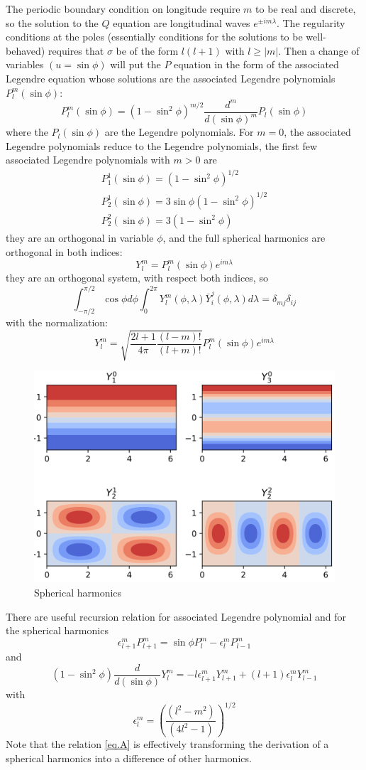 The periodic boundary condition on longitude require $m$ to be real and discrete, so the solution to the $Q$ equation are longitudinal waves $e^{\pm im\lambda}$. The regularity conditions at the poles (essentially conditions for the solutions to be well-behaved) requires that $\sigma$ be of the form $l(l+1)$ with $l\geq|m|$. Then a change of variables $(u=\sin\phi)$ will put the $P$ equation in the form of the associated Legendre equation whose solutions are the associated Legendre polynomials $P_l^m(\sin\phi)$:
\begin{equation}\label{eq.Legendre polyn}
	P_l^m(\sin\phi)=(1-\sin^2\phi)^{m/2}\frac{d^m}{d(\sin\phi)^m}P_l(\sin\phi)
\end{equation}
where the $P_l(\sin\phi)$ are the Legendre polynomials. For $m=0$, the associated Legendre polynomials reduce to the
Legendre polynomials, the first few associated Legendre
polynomials with $m>0$ are
\begin{align*}
	P_1^1(\sin\phi)=(1-\sin^2\phi)^{1/2}          \\
	P_2^1(\sin\phi)=3\sin\phi(1-\sin^2\phi)^{1/2} \\
	P_2^2(\sin\phi)=3(1-\sin^2\phi)
\end{align*}
they are an orthogonal in variable $\phi$, and the full spherical harmonics are orthogonal in both indices:
\begin{equation}
	Y_l^m=P_l^m(\sin\phi)e^{im\lambda}
\end{equation}
they are an orthogonal system, with respect both indices, so
\begin{equation}
	\int_{-\pi/2}^{\pi/2}\cos\phi d\phi\int_0^{2\pi}Y_l^m(\phi,\lambda)\bar{Y}_i^j(\phi,\lambda)d\lambda=\delta_{mj}\delta_{ij}
\end{equation}
with the normalization:
$$Y_l^m=\sqrt{\frac{2l+1}{4\pi}\frac{(l-m)!}{(l+m)!}}P_l^m(\sin\phi)e^{im\lambda}$$
\begin{figure}[h]
	\centering
	\includegraphics[width=0.5\linewidth]{uploads/Screenshot 2024-11-17 201945.png}
	\caption{Spherical harmonics}
	\label{fig:spherical harmonics}
\end{figure}
There are useful recursion relation for associated Legendre
polynomial and for the spherical harmonics
$$\epsilon_{l+1}^mP_{l+1}^m=\sin\phi P^m_l-\epsilon_l^mP^m_{l-1}$$
and
\begin{equation}\label{eq.A}
	(1-\sin^2\phi)\frac{d}{d(\sin\phi)}Y_l^m=-l\epsilon_{l+1}^mY_{l+1}^m+(l+1)\epsilon_l^mY_{l-1}^m
\end{equation}
with
$$\epsilon_l^m=\left(\frac{(l^2-m^2)}{(4l^2-1)}\right)^{1/2}$$
Note that the relation \ref{eq.A} is effectively transforming the derivation of a spherical harmonics into a difference of other harmonics.



